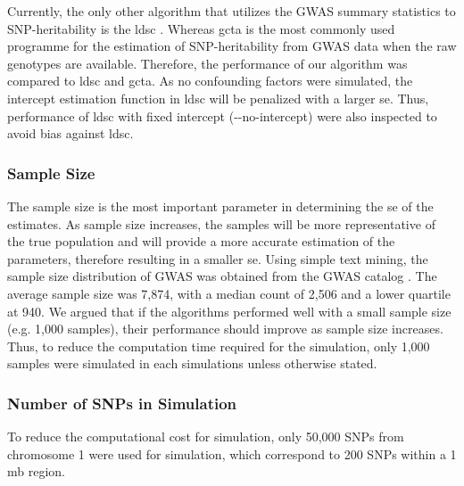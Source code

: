 		Currently, the only other algorithm that utilizes the \gls{GWAS} summary statistics to \gls{SNP}-heritability is the \gls{ldsc} \citep{Bulik-Sullivan2015}.
		Whereas \gls{gcta} \citep{Yang2011} is the most commonly used programme for the estimation of \gls{SNP}-heritability from \gls{GWAS} data when the raw genotypes are available. 
		Therefore, the performance of our algorithm was compared to \gls{ldsc} and \gls{gcta}.
		As no confounding factors were simulated, the intercept estimation function in \gls{ldsc} will be penalized with a larger \gls{se}. 
		Thus, performance of \gls{ldsc} with fixed intercept (-{}-no-intercept) were also inspected to avoid bias against \gls{ldsc}.
		
		\subsubsection{Sample Size}
			The sample size is the most important parameter in determining the \gls{se} of the estimates. 
			As sample size increases, the samples will be more representative of the true population and will provide a more accurate estimation of the parameters, therefore resulting in a smaller \gls{se}.
			Using simple text mining, the sample size distribution of \gls{GWAS} was obtained from the \gls{GWAS} catalog \citep{Welter2014}.
			The average sample size was 7,874, with a median count of 2,506 and a lower quartile at 940. 
			We argued that if the algorithms performed well with a small sample size (e.g. 1,000 samples), their performance should improve as sample size increases.
			Thus, to reduce the computation time required for the simulation, only 1,000 samples were simulated in each simulations unless otherwise stated.
				
%			
		\subsubsection{Number of SNPs in Simulation}
			To reduce the computational cost for simulation, only 50,000 \glspl{SNP} from chromosome 1 were used for simulation, which correspond to 200 \glspl{SNP} within a 1 \gls{mb} region.
			
